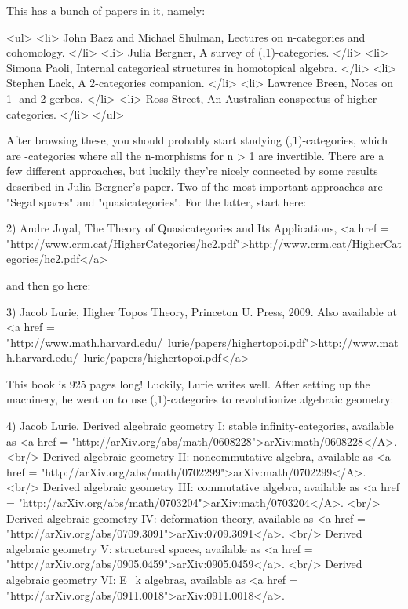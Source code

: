 This has a bunch of papers in it, namely:

<ul>
<li>
 John Baez and Michael Shulman, Lectures on n-categories and cohomology. 
</li>
<li>
 Julia Bergner, A survey of (\infty ,1)-categories.
</li>
<li>
 Simona Paoli, Internal categorical structures in homotopical algebra.
</li>
<li>
 Stephen Lack, A 2-categories companion.
</li>
<li>
 Lawrence Breen, Notes on 1- and 2-gerbes.
</li>
<li>
 Ross Street, An Australian conspectus of higher categories.
</li>
</ul>

After browsing these, you should probably start studying
(\infty ,1)-categories, which are \infty -categories where all the
n-morphisms for n > 1 are invertible.  There are a few different
approaches, but luckily they're nicely connected by some results
described in Julia Bergner's paper.  Two of the most important
approaches are "Segal spaces" and
"quasicategories".  For the latter, start here:

2) Andre Joyal, The Theory of Quasicategories and Its Applications,
<a href = "http://www.crm.cat/HigherCategories/hc2.pdf">http://www.crm.cat/HigherCategories/hc2.pdf</a>

and then go here:

3) Jacob Lurie, Higher Topos Theory, Princeton U. Press, 2009.
Also available at <a href = "http://www.math.harvard.edu/~lurie/papers/highertopoi.pdf">http://www.math.harvard.edu/~lurie/papers/highertopoi.pdf</a>

This book is 925 pages long!  Luckily, Lurie writes well.  After
setting up the machinery, he went on to use (\infty ,1)-categories
to revolutionize algebraic geometry:

4) Jacob Lurie, Derived algebraic geometry I: stable infinity-categories,
available as <a href = "http://arXiv.org/abs/math/0608228">arXiv:math/0608228</A>.
<br/>
Derived algebraic geometry II: noncommutative algebra, available as
<a href = "http://arXiv.org/abs/math/0702299">arXiv:math/0702299</A>.
<br/>
Derived algebraic geometry III: commutative algebra, available as 
<a href = "http://arXiv.org/abs/math/0703204">arXiv:math/0703204</A>.
<br/>
Derived algebraic geometry IV: deformation theory, available as 
<a href = "http://arXiv.org/abs/0709.3091">arXiv:0709.3091</a>.
<br/>
Derived algebraic geometry V: structured spaces, available as 
<a href = "http://arXiv.org/abs/0905.0459">arXiv:0905.0459</a>.
<br/>
Derived algebraic geometry VI: E_{k} algebras, available as <a
href = "http://arXiv.org/abs/0911.0018">arXiv:0911.0018</a>.

